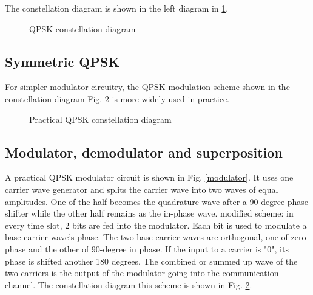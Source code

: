 \documentclass{book}
\begin{document}
The constellation diagram is shown in the left diagram in \ref{4QPSK}.

\begin{figure}[ht]
\caption{QPSK constellation diagram}
\label{4QPSK}
\end{figure}

\subsection{Symmetric QPSK}
For simpler modulator circuitry, the QPSK modulation scheme shown in the constellation diagram Fig. \ref{QPSK} is more widely used in practice.
\begin{figure}[ht]
\caption{Practical QPSK constellation diagram}
\label{QPSK}
\end{figure}

\subsection{Modulator, demodulator and superposition}
A practical QPSK modulator circuit is shown in Fig. \ref{modulator}. It uses one carrier wave generator and splits the carrier wave into two waves of equal amplitudes. One of the half becomes the quadrature wave after a 90-degree phase shifter while the other half remains as the in-phase wave. modified scheme: in every time slot, 2 bits are fed into the modulator. Each bit is used to modulate a base carrier wave's phase. The two base carrier waves are orthogonal, one of zero phase and the other of 90-degree in phase. If the input to a carrier is "0", its phase is shifted another 180 degrees. The combined or summed up wave of the two carriers is the output of the modulator going into the communication channel. The constellation diagram this scheme is shown in Fig. \ref{QPSK}.
\end{document}
